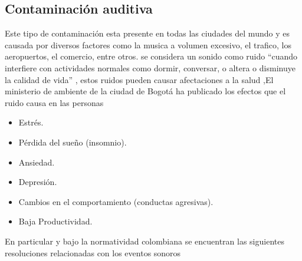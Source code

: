  


\subsection{Contaminación auditiva}

Este tipo de contaminación esta presente en todas las ciudades del mundo y es causada por diversos factores como la musica a volumen excesivo, el trafico, los aeropuertos, el comercio, entre otros. se considera un sonido como ruido ``cuando interfiere con actividades normales como dormir, conversar, o altera o disminuye la calidad de vida'' \cite{Agency}, estos ruidos pueden causar afectaciones a la salud\cite{ScientificAssistant1981}  ,El ministerio de ambiente de la ciudad de Bogotá ha publicado los efectos que el ruido causa en las personas \cite{Ambiente} 
\begin{itemize}
    \item{Estrés.}
    \item{Pérdida del sueño (insomnio).}
    \item{Ansiedad.}
    \item{Depresión.}
    \item{Cambios en el comportamiento (conductas agresivas).}
    \item{Baja Productividad.}
\end{itemize}
En particular y bajo la normatividad colombiana se encuentran las siguientes resoluciones relacionadas con los eventos sonoros  \cite{Ambiente}

